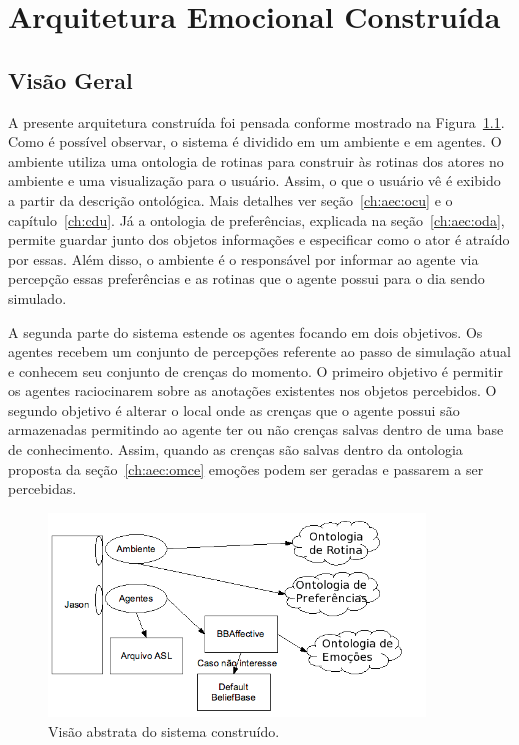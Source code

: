\chapter{Arquitetura Emocional Constru\'ida} \label{ch:aec}

\section{Visão Geral}

A presente arquitetura construída foi pensada conforme mostrado na
Figura~\ref{fig:vasc}. Como é possível observar, o sistema é dividido em um
ambiente e em agentes. O ambiente utiliza uma ontologia de rotinas para
construir às rotinas dos atores no ambiente e uma visualização para o usuário.
Assim, o que o usuário vê é exibido a partir da
descrição ontológica. Mais detalhes ver seção~\ref{ch:aec:ocu} e o
capítulo~\ref{ch:cdu}. Já a ontologia de preferências, explicada na
seção~\ref{ch:aec:oda}, permite guardar junto dos objetos informações e
especificar como o ator é atraído por essas.\dev{} Além disso, o ambiente é
o responsável por informar ao agente via percepção essas preferências e as
rotinas que o agente possui para o dia sendo simulado.

A segunda parte do sistema estende os agentes focando em dois objetivos.
Os agentes recebem um conjunto de percepções referente ao passo de simulação
atual e conhecem seu conjunto de crenças do momento.
O primeiro objetivo é permitir os agentes raciocinarem sobre as anotações existentes nos objetos percebidos.
O segundo objetivo é alterar o local onde as crenças que o agente possui são
armazenadas permitindo ao agente ter ou não crenças salvas dentro de uma
base de conhecimento. Assim, quando as crenças são salvas dentro da ontologia
proposta da seção~\ref{ch:aec:omce} emoções podem ser geradas e passarem a ser
percebidas.

\begin{figure}
  \centering
  \includegraphics[width=10cm]{figuras/visao-geral.png}
  \caption{Visão abstrata do sistema construído.}
  \label{fig:vasc}
\end{figure}

